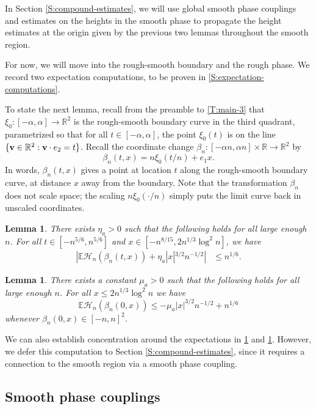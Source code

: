 \documentclass[11pt,twoside]{amsart}
\theoremstyle{plain}
\newtheorem{lem}[thm]{Lemma}
\numberwithin{quest}{section}
\theoremstyle{remark}
\numberwithin{rem}{section}
\theoremstyle{definition}
\newcommand{\R}{\mathbb{R}}
\newcommand{\E}{\mathbb{E}}
\begin{document}
	
	
	In Section \ref{S:compound-estimates}, we will use global smooth phase couplings and estimates on the heights in the smooth phase to propagate the height estimates at the origin given by the previous two lemmas throughout the smooth region. 
	
	For now, we will move into the rough-smooth boundary and the rough phase. We record two expectation computations, to be proven in \cref{S:expectation-computations}.
	
	To state the next lemma, recall from the preamble to \cref{T:main-3} that $\xi_0:[-\alpha, \alpha] \to \R^2$ is the rough-smooth boundary curve in the third quadrant, parametrized so that for all $t \in [-\alpha, \alpha]$, the point $\xi_0(t)$ is on the line $\{ {\bf v} \in \R^2 : \mathbf{v} \cdot e_2 = t \}$. Recall the coordinate change $\beta_n:[-\alpha n,  \alpha n] \times \R \to \R^2$ by
	$$
	\beta_n(t, x) = n\xi_0(t/n) + e_1 x.
	$$
	In words, $\beta_n(t, x)$ gives a point at location $t$ along the rough-smooth boundary curve, at distance $x$ away from the boundary. Note that the transformation $\beta_n$ does not scale space; the scaling $n \xi_0(\cdot/n)$ simply puts the limit curve back in unscaled coordinates. 
	
	\begin{lem}
		\label{L:expectation-computation}
		There exists $\eta_a > 0$ such that the following holds for all large enough $n$. For all $t \in [-n^{5/6}, n^{5/6}]$ and $x \in [-n^{8/15}, 2n^{1/3} \log^2 n]$, we have
		\begin{align*}
			|\E \mathcal H_n(\beta_n(t, x)) + \eta_a |x|^{3/2} n^{-1/2}| &\le n^{1/6}.
		\end{align*}
	\end{lem}
	
	\begin{lem}
		\label{L:expectation-computation-2}
		There exists a constant $\mu_a > 0$ such that the following holds for all large enough $n$. For all $x \le 2n^{1/3} \log^2 n$ we have
		$$
		\E \mathcal H_n(\beta_n(0, x)) \le -\mu_a |x|^{3/2} n^{-1/2} + n^{1/6}
		$$
		whenever $\beta_n(0, x) \in [-n, n]^2$.
	\end{lem}

	
	We can also establish concentration around the expectations in \cref{L:expectation-computation} and \ref{L:expectation-computation-2}. However, we defer this computation to Section \ref{S:compound-estimates}, since it requires a connection to the smooth region via a smooth phase coupling.
	\subsection{Smooth phase couplings}
	\label{S:smooth-phase-couplings}
	
\end{document}
